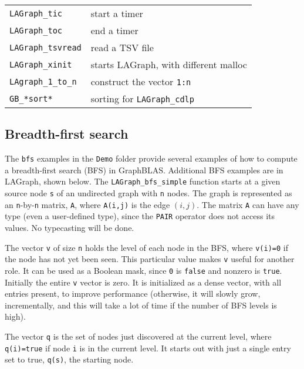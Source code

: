 \documentclass[12pt]{article}
\begin{document}
{\begin{tabular}{ll}
\verb'LAGraph_tic'              & start a timer \\
\verb'LAGraph_toc'              & end a timer \\
\verb'LAGraph_tsvread'          & read a TSV file \\
\verb'LAGraph_xinit'            & starts LAGraph, with different malloc \\
\verb'LAgraph_1_to_n'           & construct the vector \verb'1:n' \\
\verb'GB_*sort*'                & sorting for \verb'LAGraph_cdlp' \\
\end{tabular}}


\newpage
\subsection{Breadth-first search}
\label{bfs}

The \verb'bfs' examples in the \verb'Demo' folder provide several examples of
how to compute a breadth-first search (BFS) in GraphBLAS.  Additional BFS
examples are in LAGraph, shown below.  The \verb'LAGraph_bfs_simple' function
starts at a given source node \verb's' of an undirected graph with \verb'n'
nodes.  The graph is represented as an \verb'n'-by-\verb'n' matrix, \verb'A',
where \verb'A(i,j)' is the edge $(i,j)$.  The matrix \verb'A' can have any type
(even a user-defined type), since the \verb'PAIR' operator does not access its
values.  No typecasting will be done.

The vector \verb'v' of size \verb'n' holds the level of each node in the BFS,
where \verb'v(i)=0' if the node has not yet been seen.  This particular value
makes \verb'v' useful for another role.  It can be used as a Boolean mask,
since \verb'0' is \verb'false' and nonzero is \verb'true'.  Initially the
entire \verb'v' vector is zero.  It is initialized as a dense vector, with all
entries present, to improve performance (otherwise, it will slowly grow,
incrementally, and this will take a lot of time if the number of BFS levels is
high).

The vector \verb'q' is the set of nodes just discovered at the current level,
where \verb'q(i)=true' if node \verb'i' is in the current level.  It starts out
with just a single entry set to true, \verb'q(s)', the starting node.
\end{document}
